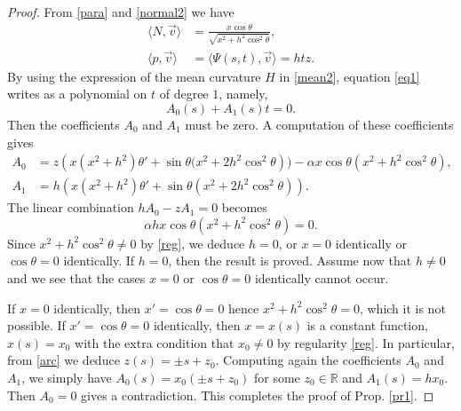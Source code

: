 \documentclass[10pt,a4paper]{amsart}
\def\r{\mathbb R}
\begin{document}
\begin{proof} From \eqref{para} and \eqref{normal2} we have 
\begin{equation*}
\begin{split}
\langle N,\vec{v}\rangle&=\frac{x\cos\theta}{\sqrt{x^2+h^2\cos^2\theta}},\\
\langle p,\vec{v}\rangle&=\langle \Psi(s,t),\vec{v}\rangle=htz.
\end{split}
\end{equation*}
By using the expression of the mean curvature $H$ in \eqref{mean2}, equation \eqref{eq1} writes as a polynomial on $t$ of degree $1$, namely, 
$$A_0(s)+A_1(s) t=0.$$
Then the coefficients $A_0$ and $A_1$ must be zero. A computation of these coefficients gives
\begin{equation*}
\begin{split}
A_0&=z \left(x (x^2+h^2) \theta '+\sin\theta (x^2+2 h^2 \cos ^2\theta\right))- \alpha  x \cos \theta \left(x^2+h^2 \cos ^2\theta\right),\\
A_1&=h \left(x (x^2+h^2) \theta '+\sin\theta (x^2+2 h^2 \cos ^2\theta )\right).
\end{split}
\end{equation*}
The linear combination $h A_0-z A_1=0$ becomes
$$\alpha h x\cos\theta(x^2+h^2\cos^2\theta)=0.$$
Since $x^2+h^2\cos^2\theta\not=0$ by \eqref{reg}, we deduce $h=0$, or $x=0$ identically or $\cos\theta=0$ identically. If $h=0$, then the result is proved. Assume now that $h\not=0$ and we see that the cases $x=0$ or $\cos\theta=0$ identically cannot occur. 

If $x=0$ identically, then $x'=\cos\theta=0$ hence $x^2+h^2\cos^2\theta=0$, which it is not possible. If $x'=\cos\theta=0$ identically, then $x=x(s)$ is a constant function, $x(s)=x_0$ with the extra condition that $x_0\not=0$ by  regularity \eqref{reg}. In particular, from \eqref{arc} we deduce $z(s)=\pm s+z_0$. Computing again  the coefficients  $A_0$ and $A_1$, we simply have 
$A_0(s)=x_0(\pm s+z_0)$ for some $z_0\in\r$ and $A_1(s)=hx_0$. Then $A_0=0$ gives a contradiction. This completes the proof of Prop. \ref{pr1}.
\end{proof}
\end{document}
